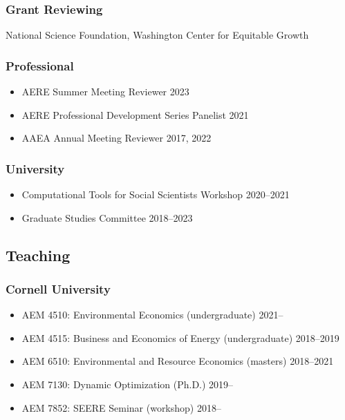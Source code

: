 \documentclass[12pt]{res} %
\begin{document}
\begin{resume}
\vspace{-.2in}

\subsubsection{Grant Reviewing} 

\vspace{-.2in}

National Science Foundation, Washington Center for Equitable Growth

\vspace{-.2in}


\subsubsection{Professional}
\begin{itemize} \itemsep -1pt
	\item[] AERE Summer Meeting Reviewer \hfill 2023
	\item[]	AERE Professional Development Series Panelist \hfill 2021
	\item[] AAEA Annual Meeting Reviewer \hfill 2017, 2022
\end{itemize}


\vspace{-.2in}

\subsubsection{University}
\begin{itemize} \itemsep -1pt
	\item[] Computational Tools for Social Scientists Workshop \hfill 2020--2021
	\item[]	Graduate Studies Committee \hfill 2018--2023
\end{itemize}

\vspace{-.2in}

\subsection{Teaching}\vspace{-.2in}
\subsubsection{Cornell University}
\begin{itemize} \itemsep -1pt
	\item[] AEM 4510: Environmental Economics (undergraduate) \hfill 2021--
	\item[] AEM 4515: Business and Economics of Energy (undergraduate) \hfill 2018--2019
	\item[] AEM 6510: Environmental and Resource Economics (masters) \hfill 2018--2021
	\item[] AEM 7130: Dynamic Optimization (Ph.D.) \hfill 2019--
	\item[] AEM 7852: SEERE Seminar (workshop) \hfill 2018--
\end{itemize}\vspace{-.3in}

\end{resume}
\end{document}
